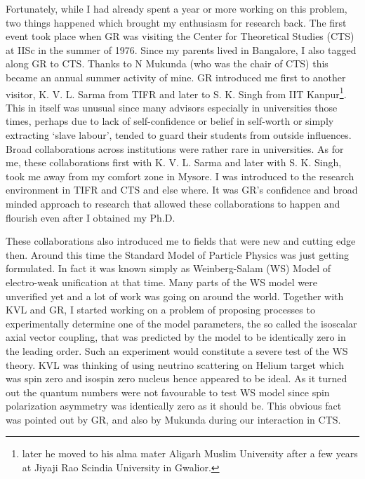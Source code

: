 Fortunately, while I had already spent a year or more working on this problem, two things happened which brought my enthusiasm for research back. The first event took place when GR was visiting the Center for Theoretical Studies (CTS) at IISc in the summer of 1976. Since my parents lived in Bangalore, I also tagged along GR to CTS. Thanks to N Mukunda (who was the chair of CTS) this became an annual summer activity of mine. GR introduced me first to another visitor, K. V. L. Sarma from TIFR and later to S. K. Singh from IIT Kanpur\footnote{later he moved to his alma mater Aligarh Muslim University after a few years at Jiyaji Rao Scindia University in Gwalior.}. This in itself was unusual since many advisors especially in universities those times, perhaps due to lack of self-confidence or belief in self-worth or simply extracting ‘slave labour’, tended to guard their students from outside influences. Broad collaborations across institutions were rather rare in universities. As for me, these collaborations first with K. V. L. Sarma and later with S. K. Singh, took me away from my comfort zone in Mysore. I was introduced to the research environment in TIFR and CTS and else where. It was GR’s confidence and broad minded approach to research that allowed these collaborations to happen and flourish even after I obtained my Ph.D.

These collaborations also introduced me to fields that were new and cutting edge then. Around this time the Standard Model of Particle Physics was just getting formulated. In fact it was known simply as Weinberg-Salam (WS) Model of electro-weak unification at that time. Many parts of the WS model were unverified yet and a lot of work was going on around the world. Together with KVL and GR, I started working on a problem of proposing processes to experimentally determine one of the model parameters, the so called the isoscalar axial vector coupling, that was predicted by the model to be identically zero in the leading order. Such an experiment would constitute a severe test of the WS theory. KVL was thinking of using neutrino scattering on Helium target which was spin zero and isospin zero nucleus hence appeared to be ideal. As it turned out the quantum numbers were not favourable to test WS model since spin polarization asymmetry was identically zero as it should be. This obvious fact was pointed out by GR, and also by Mukunda during our interaction in CTS.


